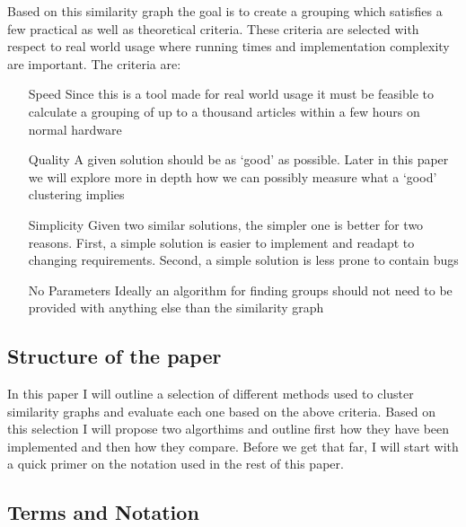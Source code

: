 Based on this similarity graph the goal is to create a grouping which 
satisfies a few practical as well as theoretical criteria. These 
criteria are selected with respect to real world usage where running 
times and implementation complexity are important.  The criteria are:
\begin{itemize}
	\item[Speed]{Since this is a tool made for real world usage it must 
			be feasible to calculate a grouping of up to a thousand 
		articles within a few hours on normal hardware}
	\item[Quality]{A given solution should be as `good' as possible.  
			Later in this paper we will explore more in depth how we can 
		possibly measure what a `good' clustering implies}
	\item[Simplicity]{Given two similar solutions, the simpler one is 
			better for two reasons. First, a simple solution is easier 
			to implement and readapt to changing requirements. Second, a 
		simple solution is less prone to contain bugs}
	\item[No Parameters]{Ideally an algorithm for finding groups should 
		not need to be provided with anything else than the similarity 
	graph}
\end{itemize}

\subsection{Structure of the paper}

In this paper I will outline a selection of different methods used to 
cluster similarity graphs and evaluate each one based on the above 
criteria. Based on this selection I will propose two algorthims and 
outline first how they have been implemented and then how they compare.  
Before we get that far, I will start with a quick primer on the notation 
used in the rest of this paper.

\subsection{Terms and Notation}

